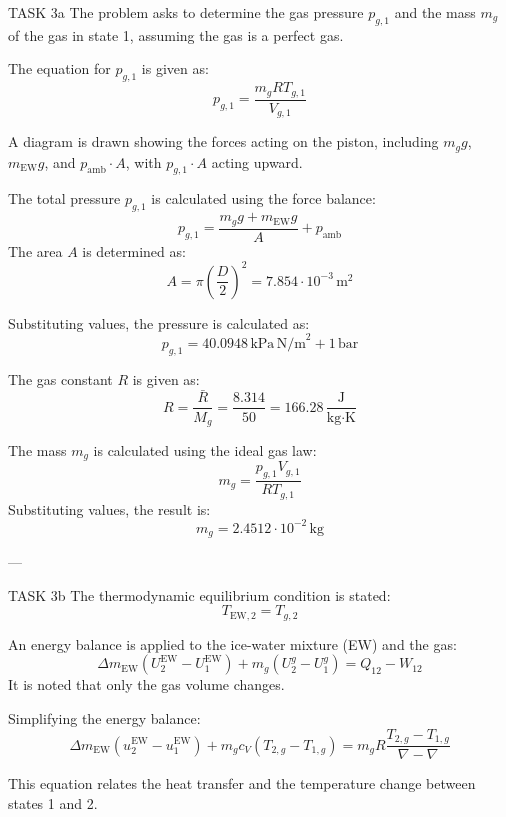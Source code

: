 TASK 3a  
The problem asks to determine the gas pressure \( p_{g,1} \) and the mass \( m_g \) of the gas in state 1, assuming the gas is a perfect gas.  

The equation for \( p_{g,1} \) is given as:  
\[
p_{g,1} = \frac{m_g R T_{g,1}}{V_{g,1}}
\]  

A diagram is drawn showing the forces acting on the piston, including \( m_g g \), \( m_{\text{EW}} g \), and \( p_{\text{amb}} \cdot A \), with \( p_{g,1} \cdot A \) acting upward.  

The total pressure \( p_{g,1} \) is calculated using the force balance:  
\[
p_{g,1} = \frac{m_g g + m_{\text{EW}} g}{A} + p_{\text{amb}}
\]  
The area \( A \) is determined as:  
\[
A = \pi \left(\frac{D}{2}\right)^2 = 7.854 \cdot 10^{-3} \, \text{m}^2
\]  

Substituting values, the pressure is calculated as:  
\[
p_{g,1} = 40.0948 \, \text{kPa} \, \text{N/m}^2 + 1 \, \text{bar}
\]  

The gas constant \( R \) is given as:  
\[
R = \frac{\bar{R}}{M_g} = \frac{8.314}{50} = 166.28 \, \frac{\text{J}}{\text{kg·K}}
\]  

The mass \( m_g \) is calculated using the ideal gas law:  
\[
m_g = \frac{p_{g,1} V_{g,1}}{R T_{g,1}}
\]  
Substituting values, the result is:  
\[
m_g = 2.4512 \cdot 10^{-2} \, \text{kg}
\]  

---

TASK 3b  
The thermodynamic equilibrium condition is stated:  
\[
T_{\text{EW},2} = T_{g,2}
\]  

An energy balance is applied to the ice-water mixture (EW) and the gas:  
\[
\Delta m_{\text{EW}} (U_{2}^{\text{EW}} - U_{1}^{\text{EW}}) + m_g (U_{2}^{g} - U_{1}^{g}) = Q_{12} - W_{12}
\]  
It is noted that only the gas volume changes.  

Simplifying the energy balance:  
\[
\Delta m_{\text{EW}} (u_{2}^{\text{EW}} - u_{1}^{\text{EW}}) + m_g c_V (T_{2,g} - T_{1,g}) = m_g R \frac{T_{2,g} - T_{1,g}}{\nabla - \nabla}
\]  

This equation relates the heat transfer and the temperature change between states 1 and 2.